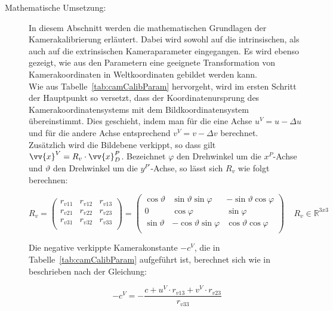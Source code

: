 \begin{description}
\item[Mathematische Umsetzung:] In diesem Abschnitt werden die mathematischen Grundlagen der Kamerakalibrierung erläutert. Dabei wird sowohl auf die intrinsischen, als auch auf die extrinsischen Kameraparameter eingegangen. Es wird ebenso gezeigt, wie aus den Parametern eine geeignete Transformation von Kamerakoordinaten in Weltkoordinaten gebildet werden kann.\\
 Wie aus Tabelle~\ref{tab:camCalibParam} hervorgeht, wird im ersten Schritt der Hauptpunkt so versetzt, dass der Koordinatenursprung des Kamerakoordinatensystems mit dem Bildkoordinatensystem übereinstimmt. Dies geschieht, indem man für die eine Achse $u^V = u - \Delta u$ und für die andere Achse entsprechend $v^V = v - \Delta v$ berechnet.\\
Zusätzlich wird die Bildebene verkippt, so dass gilt $\vv{x}^V = R_v \cdot \vv{x}^P_D$. Bezeichnet $\varphi$ den Drehwinkel um die $x^P$-Achse und $\vartheta$ den Drehwinkel um die $y^{P'}$-Achse, so lässt sich $R_v$ wie folgt berechnen:

\begin{equation}
\label{equ:Rverkippt}
R_v = 
\begin{pmatrix}
r_{v11} & r_{v12} & r_{v13} \\
r_{v21} & r_{v22} & r_{v23} \\
r_{v31} & r_{v32} & r_{v33} \\
\end{pmatrix} = 
\begin{pmatrix}
\cos\vartheta & \sin\vartheta \sin\varphi & -\sin\vartheta \cos\varphi \\
0 & \cos\varphi & \sin\varphi\\
\sin\vartheta & -\cos\vartheta \sin\varphi & \cos\vartheta \cos\varphi \\
\end{pmatrix} 
~ ~ ~ ~ ~R_v \in \mathbb{R}^{3x3}
\end{equation}

Die negative verkippte Kamerakonstante $-c^V$, die in Tabelle~\ref{tab:camCalibParam} aufgeführt ist, berechnet sich wie in~\citep{Meisel:77890} beschrieben nach der Gleichung:

\begin{equation}
-c^V = - \frac{c+u^V \cdot r_{v13} + v^V \cdot r_{v23}}{r_{v33}}
\end{equation}


\end{description}
